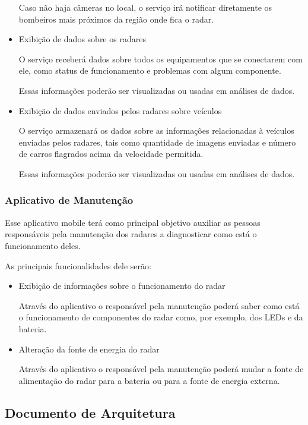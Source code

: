\begin{itemize}
Caso não haja câmeras no local, o serviço irá notificar diretamente os bombeiros mais próximos da região onde fica o radar.

\item{Exibição de dados sobre os radares}

O serviço receberá dados sobre todos os equipamentos que se conectarem com ele, como status de funcionamento e problemas com algum componente.

Essas informações poderão ser visualizadas ou usadas em análises de dados.

\item{Exibição de dados enviados pelos radares sobre veículos}

O serviço armazenará os dados sobre as informações relacionadas à veículos enviadas pelos radares, tais como quantidade de imagens enviadas e número de carros flagrados acima da velocidade permitida.

Essas informações poderão ser visualizadas ou usadas em análises de dados.
\end{itemize}

\subsubsection{Aplicativo de Manutenção}

Esse aplicativo mobile terá como principal objetivo auxiliar as pessoas responsáveis pela manutenção dos radares a diagnosticar como está o funcionamento deles.

As principais funcionalidades dele serão:

\begin{itemize}


\item{Exibição de informações sobre o funcionamento do radar}

Através do aplicativo o responsável pela manutenção poderá saber como está o funcionamento de componentes do radar como, por exemplo, dos LEDs e da bateria.

\item{Alteração da fonte de energia do radar}

Através do aplicativo o responsável pela manutenção poderá mudar a fonte de alimentação do radar para a bateria ou para a fonte de energia externa.

\end{itemize}

\subsection{Documento de Arquitetura}\label{documento-de-arquitetura}

